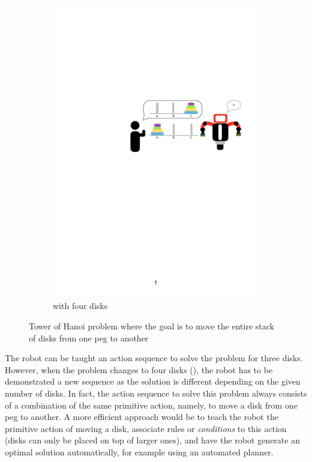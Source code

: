 \begin{figure}[htp]
\begin{subfigure}[t]{0.45\textwidth}
	\includegraphics[width=\textwidth]{figures/hanoi-1}
	\caption{with four disks}
	\label{fig:Tower of Hanoi 4}
\end{subfigure}
\caption{Tower of Hanoi problem where the goal is to move the entire stack of disks from one peg to another}
\label{fig:Tower of Hanoi}
\end{figure}

The robot can be taught an action sequence to solve the problem for three disks.
However, when the problem changes to four disks (), the robot has to be demonstrated a new sequence %
as the solution is different depending on the given number of disks.
In fact, the action sequence to solve this problem always consists of a combination of the same primitive action, namely, to move a disk from one peg to another.
A more efficient approach would be to teach the robot the primitive action of moving a disk, associate rules or \textit{conditions} to this action (\eg disks can only be placed on top of larger ones), and have the robot generate an optimal solution automatically, for example using an automated planner.

